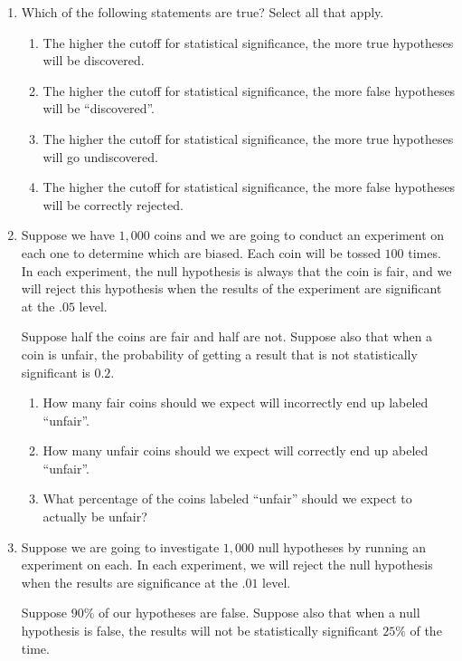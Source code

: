 \documentclass[justified]{tufte-book}
\providecommand{\tightlist}{%
  \setlength{\itemsep}{0pt}\setlength{\parskip}{0pt}}
\theoremstyle{definition}
\theoremstyle{definition}
\theoremstyle{definition}
\theoremstyle{remark}
\begin{document}
\begin{enumerate}
\item
  Which of the following statements are true? Select all that apply.

  \begin{enumerate}
  \def\labelenumii{\alph{enumii}.}
  \tightlist
  \item
    The higher the cutoff for statistical significance, the more true
    hypotheses will be discovered.
  \item
    The higher the cutoff for statistical significance, the more false
    hypotheses will be ``discovered''.
  \item
    The higher the cutoff for statistical significance, the more true
    hypotheses will go undiscovered.
  \item
    The higher the cutoff for statistical significance, the more false
    hypotheses will be correctly rejected.
  \end{enumerate}
\item
  Suppose we have \(1,000\) coins and we are going to conduct an
  experiment on each one to determine which are biased. Each coin will
  be tossed \(100\) times. In each experiment, the null hypothesis is
  always that the coin is fair, and we will reject this hypothesis when
  the results of the experiment are significant at the \(.05\) level.

  Suppose half the coins are fair and half are not. Suppose also that
  when a coin is unfair, the probability of getting a result that is not
  statistically significant is \(0.2\).

  \begin{enumerate}
  \def\labelenumii{\alph{enumii}.}
  \tightlist
  \item
    How many fair coins should we expect will incorrectly end up labeled
    ``unfair''.
  \item
    How many unfair coins should we expect will correctly end up abeled
    ``unfair''.
  \item
    What percentage of the coins labeled ``unfair'' should we expect to
    actually be unfair?
  \end{enumerate}
\item
  Suppose we are going to investigate \(1,000\) null hypotheses by
  running an experiment on each. In each experiment, we will reject the
  null hypothesis when the results are significance at the \(.01\)
  level.

  Suppose \(90\%\) of our hypotheses are false. Suppose also that when a
  null hypothesis is false, the results will not be statistically
  significant \(25\%\) of the time.


\end{enumerate}
\end{document}
